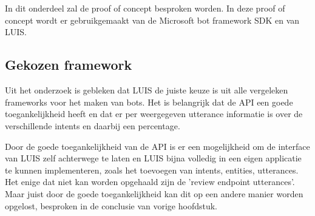 


\chapter{}
\label{ch:poc}

In dit onderdeel zal de proof of concept besproken worden. In deze proof of concept wordt er gebruikgemaakt van de Microsoft bot framework SDK en van LUIS.

\section{Gekozen framework}
\label{sec:framework}

Uit het onderzoek is gebleken dat LUIS de juiste keuze is uit alle vergeleken frameworks voor het maken van bots. Het is belangrijk dat de API een goede toegankelijkheid heeft en dat er per weergegeven utterance informatie is over de verschillende intents en daarbij een percentage.

Door de goede toegankelijkheid van de API is er een mogelijkheid om de interface van LUIS zelf achterwege te laten en LUIS bijna volledig in een eigen applicatie te kunnen implementeren, zoals het toevoegen van intents, entities, utterances. Het enige dat niet kan worden opgehaald zijn de 'review endpoint utterances'. Maar juist door de goede toegankelijkheid kan dit op een andere manier worden opgelost, besproken in de conclusie van vorige hoofdstuk.

